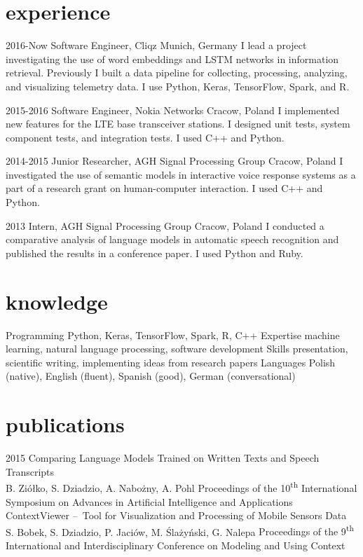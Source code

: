 \documentclass[]{friggeri-cv_osx}
\begin{document}
\section{experience}
\begin{entrylist}
\entry
{2016-Now}
{Software Engineer, Cliqz}
{Munich, Germany}
{I lead a project investigating the use of word embeddings and LSTM networks in information retrieval. Previously I built a data pipeline for collecting, processing, analyzing, and visualizing telemetry data. I use Python, Keras, TensorFlow, Spark, and R.\\}

\entry
{2015-2016}
{Software Engineer, Nokia Networks}
{Cracow, Poland}
{I implemented new features for the LTE base transceiver stations. I designed unit tests, system component tests, and integration tests. I used C++ and Python.\\}

\entry
{2014-2015}
{Junior Researcher, AGH Signal Processing Group}
{Cracow, Poland}
{I investigated the use of semantic models in interactive voice response systems as a part of a research grant on human-computer interaction. I used C++ and Python.\\}

\entry
{2013}
{Intern, AGH Signal Processing Group}
{Cracow, Poland}
{I conducted a comparative analysis of language models in automatic speech recognition and published the results in a conference paper. I used Python and Ruby.\\}
\end{entrylist}

\section{knowledge}
\begin{entrylist}
\entry
{}
{Programming}
{}
{Python, Keras, TensorFlow, Spark, R, C++}
\entry
{}
{Expertise}
{}
{machine learning, natural language processing, software development}
\entry
{}
{Skills}
{}
{presentation, scientific writing, implementing ideas from research papers}
\entry
{}
{Languages}
{}
{Polish (native), English (fluent), Spanish (good), German (conversational)}
\end{entrylist}

\section{publications}
\begin{entrylist}
\entry
{2015}
{Comparing Language Models Trained on Written Texts and Speech Transcripts\\}
{B. Ziółko, S. Dziadzio, A. Nabożny, A. Pohl}
{Proceedings of the 10\textsuperscript{th} International Symposium on Advances in Artificial Intelligence and Applications\\}
\entry
{}
{ContextViewer – Tool for Visualization and Processing of Mobile Sensors Data\\}
{S. Bobek, S. Dziadzio, P. Jaciów, M. Ślażyński, G. Nalepa}
{Proceedings of the 9\textsuperscript{th} International and Interdisciplinary Conference on Modeling and Using Context}
\end{entrylist}
\end{document}
